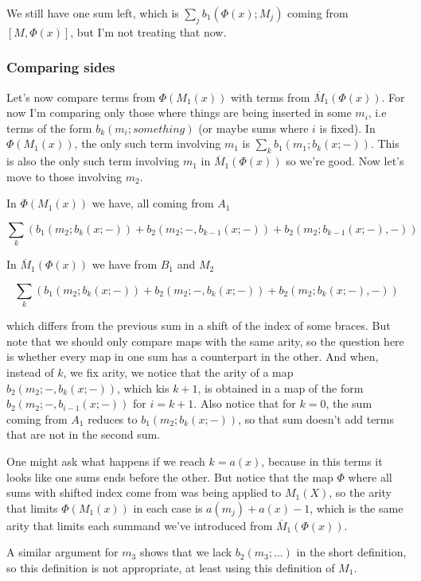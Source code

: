 \documentclass[twoside]{article}
\begin{document}
We still have one sum left, which is $\sum_j b_1(\Phi(x);M_j)$ coming from $[M,\Phi(x)]$, but I'm not treating that now.

\subsubsection{Comparing sides}
Let's now compare terms from $\Phi(M_1(x))$ with terms from $\overline{M}_1(\Phi(x))$. For now I'm comparing only  those where things are being inserted in some $m_i$, i.e terms of the form $b_k(m_i;something)$ (or maybe sums where $i$ is fixed). In $\Phi(M_1(x))$, the only such term involving $m_1$ is $\sum_k b_1(m_1;b_k(x;-))$. This is also the only such term involving $m_1$ in $\overline{M}_1(\Phi(x))$ so we're good. Now let's move to those involving $m_2$. 

In $\Phi(M_1(x))$ we have, all coming from $A_1$


$$\sum_k(b_1(m_2;b_k(x;-))+b_2(m_2;-,b_{k-1}(x;-))+b_2(m_2;b_{k-1}(x;-),-))$$

In $\overline{M}_1(\Phi(x))$ we have from $B_1$ and $M_2$

$$\sum_k (b_1(m_2;b_k(x;-))+b_2(m_2;-,b_{k}(x;-))+b_2(m_2;b_{k}(x;-),-))$$

which differs from the previous sum in a shift of the index of some braces. But note that we should only compare maps with the same arity, so the question here is whether every map in one sum has a counterpart in the other. And when, instead of $k$, we fix arity, we notice that the arity of a map $b_2(m_2;-,b_{k}(x;-))$, which kis $k+1$, is obtained in a map of the form $b_2(m_2;-,b_{i-1}(x;-))$ for $i=k+1$. Also notice that for $k=0$, the sum coming from $A_1$ reduces to $b_1(m_2;b_k(x;-))$, so that sum doesn't add terms that are not in the second sum. 

\begin{remark}
One might ask what happens if we reach $k=a(x)$, because in this terms it looks like one sums ends before the other. But notice that the map $\Phi$ where all sums with shifted index come from was being applied to $M_1(X)$, so the arity that limits $\Phi(M_1(x))$ in each case is $a(m_j)+a(x)-1$, which is the same arity that limits each summand we've introduced from $\overline{M}_1(\Phi(x))$. 
\end{remark}

A similar argument for $m_3$ shows that we lack $b_2(m_3;\dots)$ in the short definition, so this definition is not appropriate, at least using this definition of $M_1$.
\end{document}
